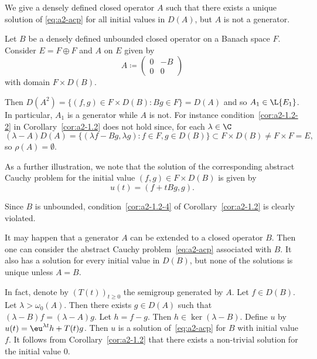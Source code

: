 \begin{example}\label{ex:a2-1.4}
We give a densely defined closed operator $ A $ such that there exists a unique solution of \eqref{eq:a2-acp} for all initial values in $ D(A) $, but $ A $ is not a generator.

Let $ B $ be a densely defined unbounded closed operator on a Banach space $ F $.
Consider $ E = F \oplus F $ and $ A $ on $ E $ given by
\[
    A \coloneqq \begin{pmatrix} 0 & -B \\ 0 & 0 \end{pmatrix}
\]
with domain $ F \times D(B) $.

Then $ D(A^{2}) = \{(f,g) \in F \times D(B) \colon Bg \in F\} = D(A) $ and so $ A_{1} \in \L{E_{1}} $.
In particular, $ A_{1} $ is a generator while
$ A $ is not. For instance
condition~\ref{cor:a2-1.2-2}   in Corollary~\ref{cor:a2-1.2}   does not hold since, for each $ \lambda \in \C $
\[
    (\lambda-A)D(A) = \{(\lambda f-Bg,\lambda g) \colon f \in F, g \in D(B)\} \subset F \times D(B) \neq F \times F = E ,
\]
so $ \rho(A) = \emptyset $.

As a further illustration, we note that the solution of the corresponding abstract Cauchy problem for the initial value $ (f,g) \in F \times D(B) $ is given by 
\[
u(t) = (f + tBg,g) .
\] 

Since $ B $ is unbounded, condition~\ref{cor:a2-1.2-4}  of Corollary~\ref{cor:a2-1.2}  is clearly violated.
\end{example}
\begin{remark*}\label{rem:a2-1.4-kgk} 
It may happen that a generator $A$ can be extended to a closed operator $B$.
Then one can consider the abstract Cauchy problem~\eqref{eq:a2-acp} associated with $B$.
It also has a solution for every initial value in $D(B)$, but none of the solutions is unique unless $A = B$.

In fact, denote by $(T(t))_{t \geq 0}$ the semigroup generated by $A$.
Let $f \in D(B)$.
Let $\lambda > \omega_{0}(A)$.
Then there exists $g \in D(A)$ such that $(\lambda-B)f = (\lambda-A)g$.
Let $h = f - g$.
Then $h \in \ker(\lambda-B)$.
Define $u$ by $u(t) = \eu^{\lambda t}h + T(t)g$.
Then $u$ is a solution of~\eqref{eq:a2-acp} for $B$ with initial value $f$.
It follows from Corollary~\ref{cor:a2-1.2} that there exists a non-trivial solution for the initial value $0$.
\end{remark*}
